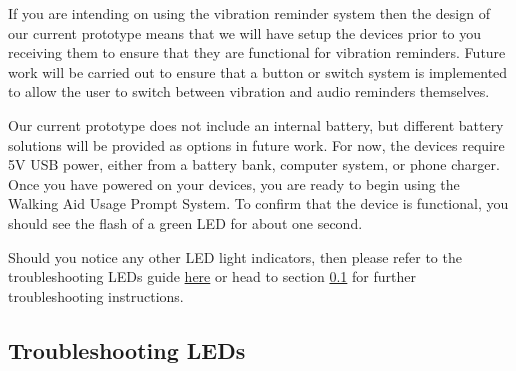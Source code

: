 				If you are intending on using the vibration reminder system then the design of our current prototype means that we will have setup the devices prior to you receiving them to ensure that they are functional for vibration reminders. Future work will be carried out to ensure that a button or switch system is implemented to allow the user to switch between vibration and audio reminders themselves.

				Our current prototype does not include an internal battery, but different battery solutions will be provided as options in future work. For now, the devices require 5V USB power, either from a battery bank, computer system, or phone charger. Once you have powered on your devices, you are ready to begin using the Walking Aid Usage Prompt System. To confirm that the device is functional, you should see the flash of a green LED for about one second.

				Should you notice any other LED light indicators, then please refer to the troubleshooting LEDs guide \hyperref[subsec:troubleshooting_leds]{here} or head to section \ref{subsec:troubleshooting_leds} for further troubleshooting instructions.

		\subsection{Troubleshooting LEDs}
		\label{subsec:troubleshooting_leds}

